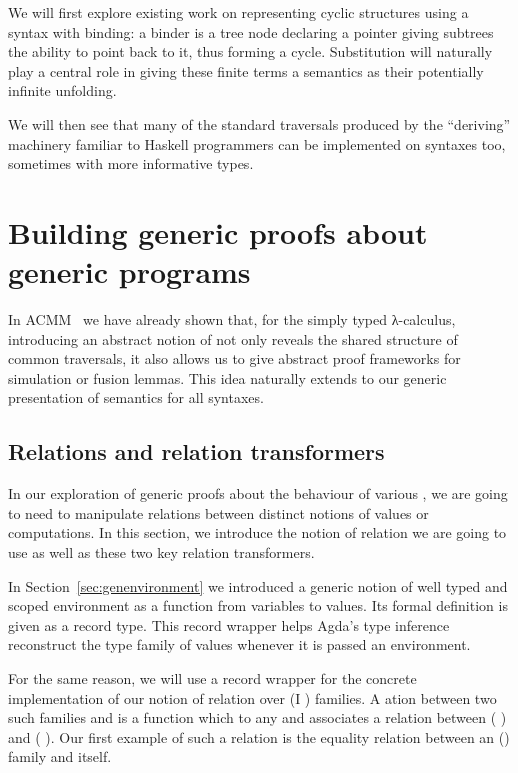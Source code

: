 We will first explore existing work on representing cyclic structures
using a syntax with binding: a binder is a tree node declaring a pointer
giving subtrees the ability to point back to it, thus forming a cycle.
Substitution will naturally play a central role in giving these finite
terms a semantics as their potentially infinite unfolding.

We will then see that many of the standard traversals produced by the
``deriving'' machinery familiar to Haskell programmers can be implemented
on syntaxes too, sometimes with more informative types.





\section{Building generic proofs about generic programs}

In ACMM~\citeyear{allais2017type} we have
already shown that, for the simply typed λ-calculus, introducing an abstract
notion of  not only reveals the shared structure of common
traversals, it also allows us to give abstract proof frameworks for
simulation or fusion lemmas. This idea naturally extends to our generic
presentation of semantics for all syntaxes.


\subsection{Relations and relation transformers}

In our exploration of generic proofs about the behaviour of various ,
we are going to need to manipulate relations between distinct notions of values or
computations. In this section, we introduce the notion of relation we are going to
use as well as these two key relation transformers.

In Section~\ref{sec:genenvironment} we introduced a generic notion of well typed
and scoped environment as a function from variables to values. Its formal definition
is given as a record type. This record wrapper helps
Agda's type inference reconstruct the type family of values whenever it is passed an
environment.

For the same reason, we will use a record wrapper for the concrete implementation of
our notion of relation over (I ) families. A ation between two
such families  and  is a function which to any  and  associates
a relation between (  ) and (  ). Our first example
of such a relation is  the equality relation between an ()
family  and itself.

